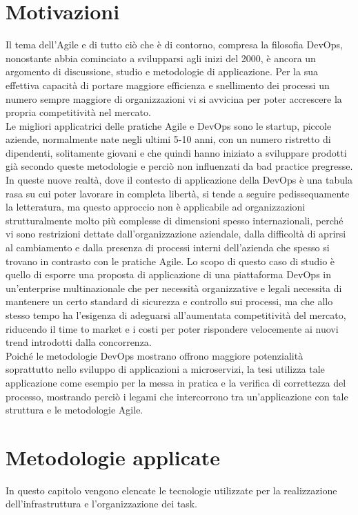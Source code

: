 \documentclass[a4paper, 12pt]{report}
\numberwithin{equation}{section}
\begin{document}
\chapter{Motivazioni}
Il tema dell’Agile e di tutto ciò che è di contorno, compresa la filosofia DevOps, nonostante abbia cominciato a svilupparsi agli inizi del 2000, è ancora un argomento di discussione, studio e metodologie di applicazione. Per la sua effettiva capacità di portare maggiore efficienza e snellimento dei processi un numero sempre maggiore di organizzazioni vi si avvicina per poter accrescere la propria competitività nel mercato.\\
Le migliori applicatrici delle pratiche Agile e DevOps sono le startup, piccole aziende, normalmente nate negli ultimi 5-10 anni, con un numero ristretto di dipendenti, solitamente giovani e che quindi hanno iniziato a sviluppare prodotti già secondo queste metodologie e perciò non influenzati da bad practice pregresse.\\
In queste nuove realtà, dove il contesto di applicazione della DevOps è una tabula rasa su cui poter lavorare in completa libertà, si tende a seguire pedissequamente la letteratura, ma questo approccio non è applicabile ad organizzazioni strutturalmente molto più complesse di dimensioni spesso internazionali, perché vi sono restrizioni dettate dall’organizzazione aziendale, dalla difficoltà di aprirsi al cambiamento e dalla presenza di processi interni dell’azienda che spesso si trovano in contrasto con le pratiche Agile.
Lo scopo di questo caso di studio è quello di esporre una proposta di applicazione di una piattaforma DevOps in un’enterprise multinazionale che per necessità organizzative e legali necessita di mantenere un certo standard di sicurezza e controllo sui processi, ma che allo stesso tempo ha l'esigenza di adeguarsi all’aumentata competitività del mercato, riducendo il time to market e i costi per poter rispondere velocemente ai nuovi trend introdotti dalla concorrenza.\\
Poiché le metodologie DevOps mostrano offrono maggiore potenzialità soprattutto nello sviluppo di 
applicazioni a microservizi, la tesi utilizza tale applicazione come esempio per la messa
in pratica e la verifica di correttezza del processo, mostrando perciò i legami che
intercorrono tra un'applicazione con tale struttura e le metodologie Agile.


\chapter{Metodologie applicate}
In questo capitolo vengono elencate le tecnologie utilizzate per la realizzazione dell’infrastruttura e l’organizzazione dei task. 
\end{document}
